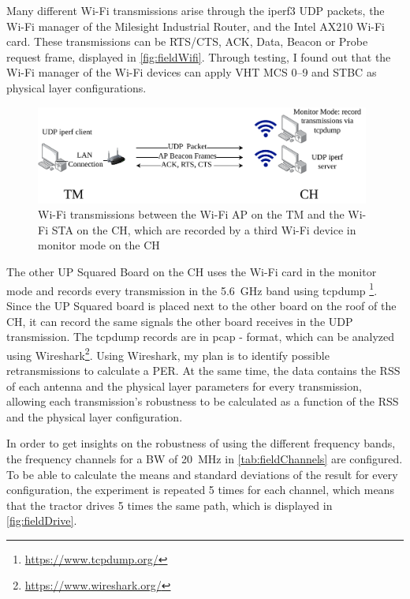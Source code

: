 Many different Wi-Fi transmissions arise through the iperf3 \ac{UDP} packets, the Wi-Fi manager of the Milesight Industrial Router, and the Intel AX210 Wi-Fi card.
These transmissions can be RTS/CTS, ACK, Data, Beacon or Probe request frame, displayed in \autoref{fig:fieldWifi}.
Through testing, I found out that the Wi-Fi manager of the Wi-Fi devices can apply \ac{VHT} \ac{MCS} \numrange{0}{9} and \ac{STBC} as physical layer configurations.

\begin{figure}[H]%
	\centering
	\includegraphics[width=0.98\textwidth]{figures/FieldExperimentwifi}
	\caption{Wi-Fi transmissions between the Wi-Fi \ac{AP} on the \acf{TM} and the Wi-Fi \ac{STA} on the \acf{CH}, which
	are recorded by a third Wi-Fi device in monitor mode on the \ac{CH}}
	\label{fig:fieldWifi}%
\end{figure}

The other UP Squared Board on the \ac{CH} uses the Wi-Fi card in the monitor mode and records every transmission in the \SI{5.6}{\giga\hertz} band using tcpdump \footnote{\url{https://www.tcpdump.org/}}.
Since the UP Squared board is placed next to the other board on the roof of the \ac{CH}, it can record the same signals the other board receives in the \ac{UDP} transmission.
The tcpdump records are in pcap - format, which can be analyzed using Wireshark\footnote{\url{https://www.wireshark.org/}}.
Using Wireshark, my plan is to identify possible retransmissions to calculate a \ac{PER}.
At the same time, the data contains the \ac{RSS} of each antenna and the physical layer parameters for every
transmission, allowing each transmission's robustness to be calculated as a function of the \ac{RSS} and the physical
layer configuration.

In order to get insights on the robustness of using the different frequency bands, the frequency channels for a \ac{BW} of \SI{20}{\mega\hertz} in \autoref{tab:fieldChannels} are configured.
To be able to calculate the means and standard deviations of the result for every configuration, the experiment is repeated \num{5} times for each channel,
which means that the tractor drives \num{5} times the same path, which is displayed in \autoref{fig:fieldDrive}.

